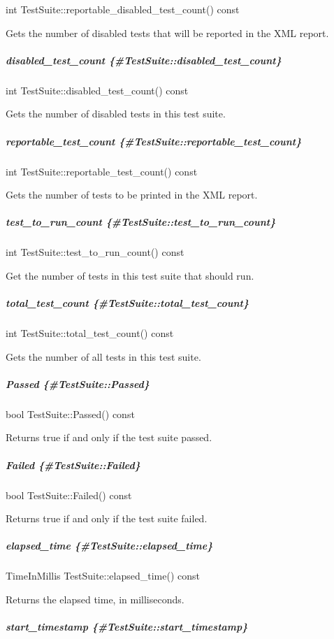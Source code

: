 {\ttfamily int Test\+Suite\+::reportable\+\_\+disabled\+\_\+test\+\_\+count() const}

Gets the number of disabled tests that will be reported in the X\+ML report.

\subparagraph*{disabled\+\_\+test\+\_\+count \{\#\+Test\+Suite\+::disabled\+\_\+test\+\_\+count\}}

{\ttfamily int Test\+Suite\+::disabled\+\_\+test\+\_\+count() const}

Gets the number of disabled tests in this test suite.

\subparagraph*{reportable\+\_\+test\+\_\+count \{\#\+Test\+Suite\+::reportable\+\_\+test\+\_\+count\}}

{\ttfamily int Test\+Suite\+::reportable\+\_\+test\+\_\+count() const}

Gets the number of tests to be printed in the X\+ML report.

\subparagraph*{test\+\_\+to\+\_\+run\+\_\+count \{\#\+Test\+Suite\+::test\+\_\+to\+\_\+run\+\_\+count\}}

{\ttfamily int Test\+Suite\+::test\+\_\+to\+\_\+run\+\_\+count() const}

Get the number of tests in this test suite that should run.

\subparagraph*{total\+\_\+test\+\_\+count \{\#\+Test\+Suite\+::total\+\_\+test\+\_\+count\}}

{\ttfamily int Test\+Suite\+::total\+\_\+test\+\_\+count() const}

Gets the number of all tests in this test suite.

\subparagraph*{Passed \{\#\+Test\+Suite\+::\+Passed\}}

{\ttfamily bool Test\+Suite\+::\+Passed() const}

Returns true if and only if the test suite passed.

\subparagraph*{Failed \{\#\+Test\+Suite\+::\+Failed\}}

{\ttfamily bool Test\+Suite\+::\+Failed() const}

Returns true if and only if the test suite failed.

\subparagraph*{elapsed\+\_\+time \{\#\+Test\+Suite\+::elapsed\+\_\+time\}}

{\ttfamily Time\+In\+Millis Test\+Suite\+::elapsed\+\_\+time() const}

Returns the elapsed time, in milliseconds.

\subparagraph*{start\+\_\+timestamp \{\#\+Test\+Suite\+::start\+\_\+timestamp\}}

